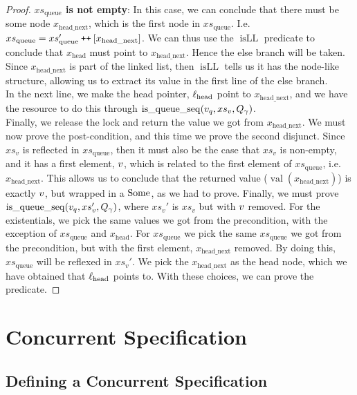 \documentclass[a4paper, 10pt]{report}
\theoremstyle{definition}
\newcommand{\isqueueseq}{\operatorname{is\_queue\_seq}}
\newcommand{\vq}{v_q}
\newcommand{\xsqueue}{xs_{\mathrm{queue}}}
\newcommand{\isLL}{\operatorname{isLL}}
\newcommand{\locN}[1]{\loc_{\mathrm{#1}}}
\newcommand{\lochead}{\locN{head}}
\newcommand{\nVal}[1]{\operatorname{val}(#1)}
\newcommand{\node}{x}
\newcommand{\nodeN}[1]{\node_{\mathrm{#1}}}
\newcommand{\nodehead}{\nodeN{head}}
\newcommand{\nodeheadnext}{\nodeN{head\_next}}
\newcommand{\absvalue}{\val}
\newcommand{\absvalueList}{xs_v}
\newcommand{\Qg}{Q_\gname}
\newcommand\catenate{\mathbin{\text{\ttfamily\upshape ++}}}
\begin{document}
\begin{proof}
\textbf{$\xsqueue$ is not empty}: In this case, we can conclude that there must be some node $\nodeheadnext$, which is the first node in $\xsqueue$. I.e. $\xsqueue = \xsqueue' \catenate [\nodeheadnext]$. We can thus use the $\isLL$ predicate to conclude that $\nodehead$ must point to $\nodeheadnext$. Hence the else branch will be taken. Since $\nodeheadnext$ is part of the linked list, then $\isLL$ tells us it has the node-like structure, allowing us to extract its value in the first line of the else branch.\\
In the next line, we make the head pointer, $\lochead$ point to $\nodeheadnext$, and we have the resource to do this through $\isqueueseq(\vq, \absvalueList, \Qg)$.\\
Finally, we release the lock and return the value we got from $\nodeheadnext$. We must now prove the post-condition, and this time we prove the second disjunct. Since $\absvalueList$ is reflected in $\xsqueue$, then it must also be the case that $\absvalueList$ is non-empty, and it has a first element, $\absvalue$, which is related to the first element of $\xsqueue$, i.e. $\nodeheadnext$. This allows us to conclude that the returned value ($\nVal{\nodeheadnext}$) is exactly $\absvalue$, but wrapped in a $\operatorname{Some}$, as we had to prove.
Finally, we must prove $\isqueueseq(\vq, \absvalueList', \Qg)$, where $\absvalueList'$ is $\absvalueList$ but with $\absvalue$ removed. For the existentials, we pick the same values we got from the precondition, with the exception of $\xsqueue$ and $\nodehead$. For $\xsqueue$ we pick the same $\xsqueue$ we got from the precondition, but with the first element, $\nodeheadnext$ removed. By doing this, $\xsqueue$ will be reflexed in $\absvalueList'$. We pick the $\nodeheadnext$ as the head node, which we have obtained that $\lochead$ points to. With these choices, we can prove the predicate.
\end{proof}

\chapter{Concurrent Specification}
\label{ch:TLMSQCONC}

\section{Defining a Concurrent Specification}
\label{TLMSQCONC:section:concurrent-spec}
\end{document}

